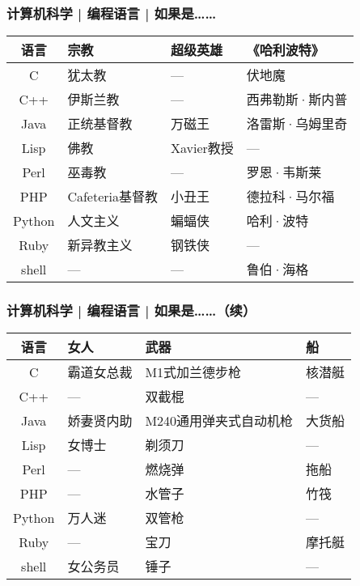 \begin{frame}
  \frametitle{计算机科学 | 编程语言 | 如果是……}
  \begin{table}
    \centering
    \begin{tabular}{clll}
      \hline
      \rowcolor{blue!50}语言 & 宗教 & 超级英雄 & 《哈利波特》\\
      \hline
      C & 犹太教 & --- & 伏地魔\\
      C++ & 伊斯兰教 & --- & 西弗勒斯·斯内普\\
      Java & 正统基督教 & 万磁王 & 洛雷斯·乌姆里奇\\
      Lisp & 佛教 & Xavier教授 & ---\\
      Perl & 巫毒教 & --- & 罗恩·韦斯莱\\
      PHP & Cafeteria基督教 & 小丑王 & 德拉科·马尔福\\
      Python & 人文主义 & 蝙蝠侠 & 哈利·波特\\
      Ruby & 新异教主义 & 钢铁侠 & ---\\
      shell & --- & --- & 鲁伯·海格\\
      \hline
    \end{tabular}
  \end{table}
\end{frame}

\begin{frame}
  \frametitle{计算机科学 | 编程语言 | 如果是……（续）}
  \begin{table}
    \centering
    \begin{tabular}{clll}
      \hline
      \rowcolor{blue!50}语言 & 女人 & 武器 & 船\\
      \hline
      C & 霸道女总裁 & M1式加兰德步枪 & 核潜艇\\
      C++ & --- & 双截棍 & ---\\
      Java & 娇妻贤内助 & M240通用弹夹式自动机枪 & 大货船\\
      Lisp & 女博士 & 剃须刀 & ---\\
      Perl & --- & 燃烧弹 & 拖船\\
      PHP & --- & 水管子 & 竹筏\\
      Python & 万人迷 & 双管枪 & ---\\
      Ruby & --- & 宝刀 & 摩托艇\\
      shell & 女公务员 & 锤子 & ---\\
      \hline
    \end{tabular}
  \end{table}
\end{frame}

